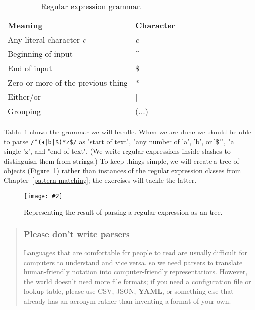 \documentclass[krantzl]{krantz}
\newcommand{\figpdf}[4]{\begin{figure}%
\centering%
\texttt{[image: \#2]}%
\caption{#3}%
\label{#1}%
\end{figure}}
\newcommand{\chapref}[1]{Chapter~\ref{#1}}
\newcommand{\figref}[1]{Figure~\ref{#1}}
\newcommand{\tblref}[1]{Table~\ref{#1}}
\newcommand{\glossref}[1]{\textbf{#1}}
\newenvironment{callout}{\savenotes\begin{tBox}\begin{quotation}\toggletrue{inbox}\renewcommand{\thempfootnote}{\arabic{footnote}}}{\end{quotation}\vspace{\baselineskip}\end{tBox}\togglefalse{inbox}\spewnotes}
\begin{document}
\begin{table}
\begin{tabular}{ll}
\textbf{\underline{Meaning}} & \textbf{\underline{Character}} \\
Any literal character \emph{c} & \emph{c} \\
Beginning of input & {\textasciicircum} \\
End of input & \$ \\
Zero or more of the previous thing & * \\
Either/or & | \\
Grouping & (...) \\
\end{tabular}
\caption{Regular expression grammar.}
\label{regex-parser-grammar-codes}
\end{table}



\tblref{regex-parser-grammar-codes} shows the grammar we will handle.
When we are done
we should be able to parse \texttt{/{\textasciicircum}(a|b|\$)*z\$/} as
"start of text",
"any number of 'a', 'b', or '\$'",
"a single 'z',
and "end of text".
(We write regular expressions inside slashes to distinguish them from strings.)
To keep things simple,
we will create a tree of objects (\figref{regex-parser-expression-tree})
rather than instances of the regular expression classes from \chapref{pattern-matching};
the exercises will tackle the latter.

\figpdf{regex-parser-expression-tree}{./regex-parser/expression-tree.pdf}{Representing the result of parsing a regular expression as an tree.}{0.6}

\begin{callout}


\subsubsection*{Please don't write parsers}


Languages that are comfortable for people to read are usually difficult for computers to understand
and vice versa,
so we need parsers to translate human-friendly notation into computer-friendly representations.
However,
the world doesn't need more file formats;
if you need a configuration file or lookup table,
please use CSV, JSON, \glossref{YAML},
or something else that already has an acronym
rather than inventing a format of your own.

\end{callout}
\end{document}
